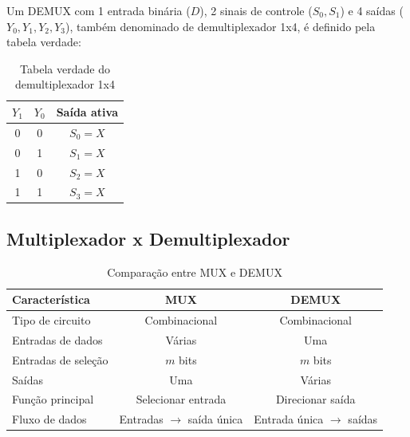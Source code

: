 \documentclass[12pt]{article}
\begin{document}
Um DEMUX com 1 entrada binária ($D$), 2 sinais de controle ($S_0, S_1$) e 4 saídas ($Y_0, Y_1, Y_2, Y_3$), também denominado de demultiplexador 1x4, é definido pela tabela verdade:

\begin{table}[h]
\centering

\begin{tabular}{|c|c|c|}
\hline
$Y_1$ & $Y_0$ & Saída ativa \\ \hline
0 & 0 & $S_0 = X$ \\ \hline
0 & 1 & $S_1 = X$ \\ \hline
1 & 0 & $S_2 = X$ \\ \hline
1 & 1 & $S_3 = X$ \\ \hline
\end{tabular}

\caption{Tabela verdade do demultiplexador 1x4}
\label{tab:demux4x1}
\end{table}

\newpage
\subsection{Multiplexador x Demultiplexador}

\begin{table}[h]
\centering
\begin{tabular}{|l|c|c|}
\hline
\textbf{Característica} & \textbf{MUX} & \textbf{DEMUX} \\ \hline
Tipo de circuito & Combinacional & Combinacional \\ \hline
Entradas de dados & Várias & Uma \\ \hline
Entradas de seleção & $m$ bits & $m$ bits \\ \hline
Saídas & Uma & Várias \\ \hline
Função principal & Selecionar entrada & Direcionar saída \\ \hline
Fluxo de dados & Entradas $\rightarrow$ saída única & Entrada única $\rightarrow$ saídas \\ \hline
\end{tabular}
\caption{Comparação entre MUX e DEMUX}
\end{table}
\end{document}
